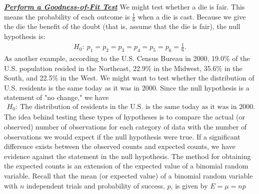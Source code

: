 \documentclass{report}
\begin{document}
    \pagebreak \bigbreak \noindent 
    \textbf{\textit{\underline{Perform a Goodness-of-Fit Test}}}
    \bigbreak \noindent 
    We might test whether a die is fair. This means the probability of each outcome is $\frac{1}{6}$ when a die is cast. Because we give the die the benefit of the doubt (that is, assume that the die is fair), the null hypothesis is:
    \begin{align*}
        H_0:\ p_1 = p_2 = p_3 = p_4 = p_5 = p_6 = \frac{1}{6}
    .\end{align*}
    \bigbreak \noindent 
    As another example, according to the U.S. Census Bureau in 2000, 19.0\% of the U.S. population resided in the Northeast, 22.9\% in the Midwest, 35.6\% in the South, and 22.5\% in the West. We might want to test whether the distribution of U.S. residents is the same today as it was in 2000. Since the null hypothesis is a statement of "no change," we have
    \begin{align*}
        H_{0}:\ \text{The distribution of residents in the U.S. is the same today as it was in  2000}
    .\end{align*}
    \bigbreak \noindent 
    The idea behind testing these types of hypotheses is to compare the actual (or observed) number of observations for each category of data with the number of observations we would expect if the null hypothesis were true. If a significant difference exists between the observed counts and expected counts, we have evidence against the statement in the null hypothesis.
    \bigbreak \noindent 
    The method for obtaining the expected counts is an extension of the expected value of a binomial random variable. Recall that the mean (or expected value) of a binomial random variable with $n $ independent trials and probability of success, $p $, is given by $E=\mu=np $
\end{document}
